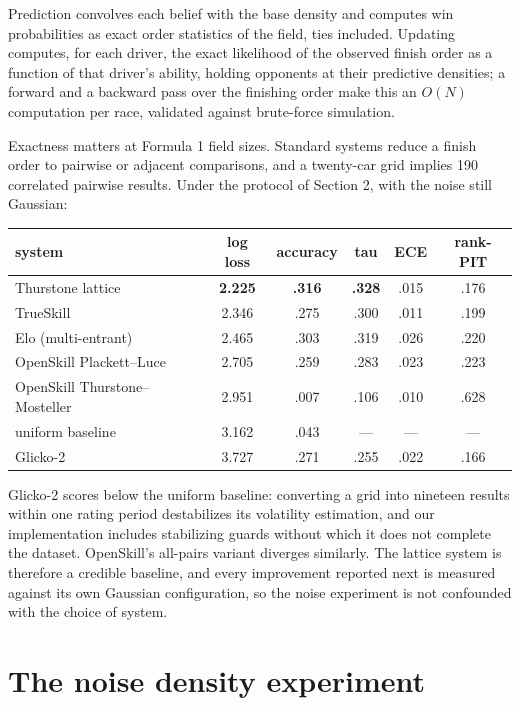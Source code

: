 \documentclass[11pt]{article}
\begin{document}
Prediction convolves each belief with the base density and computes win
probabilities as exact order statistics of the field, ties included.
Updating computes, for each driver, the exact likelihood of the observed
finish order as a function of that driver's ability, holding opponents at
their predictive densities; a forward and a backward pass over the
finishing order make this an $O(N)$ computation per race, validated
against brute-force simulation.

Exactness matters at Formula 1 field sizes. Standard systems reduce a
finish order to pairwise or adjacent comparisons, and a twenty-car grid
implies 190 correlated pairwise results. Under the protocol of Section 2,
with the noise still Gaussian:

\begin{center}
\begin{tabular}{lccccc}
\toprule
system & log loss & accuracy & tau & ECE & rank-PIT \\
\midrule
Thurstone lattice & \textbf{2.225} & \textbf{.316} & \textbf{.328} & .015 & .176 \\
TrueSkill & 2.346 & .275 & .300 & .011 & .199 \\
Elo (multi-entrant) & 2.465 & .303 & .319 & .026 & .220 \\
OpenSkill Plackett--Luce & 2.705 & .259 & .283 & .023 & .223 \\
OpenSkill Thurstone--Mosteller & 2.951 & .007 & .106 & .010 & .628 \\
uniform baseline & 3.162 & .043 & --- & --- & --- \\
Glicko-2 & 3.727 & .271 & .255 & .022 & .166 \\
\bottomrule
\end{tabular}
\end{center}

Glicko-2 scores below the uniform baseline: converting a grid into
nineteen results within one rating period destabilizes its volatility
estimation, and our implementation includes stabilizing guards without
which it does not complete the dataset. OpenSkill's all-pairs variant
diverges similarly. The lattice system is therefore a credible baseline,
and every improvement reported next is measured against its own Gaussian
configuration, so the noise experiment is not confounded with the choice
of system.

\section{The noise density experiment}
\end{document}
